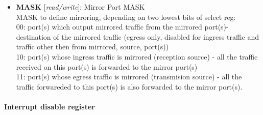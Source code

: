 \vspace{12pt}
\noindent
{}

\begin{itemize}
\item \begin{small}
{\bf 
MASK
} [\emph{read/write}]: Mirror Port MASK
\\
MASK to define mirroring, depending on two lowest bits of select reg:\\         00: port(s) which output mirrored traffic from the mirrored port(s)- destination of the mirrored traffic (egress only, disabled for ingress traffic and traffic other then from mirrored, source, port(s))\\         10: port(s) whose ingress traffic is mirrored (reception source) - all the traffic received on this port(s) is forwarded to the mirror port(s)\\         11: port(s) whose egress traffic is mirrored (transmision source) - all the traffic forwareded to this port(s) is also forwarded to the mirror port(s).
\end{small}
\end{itemize}
\paragraph*{Interrupt disable register}\vspace{12pt}

